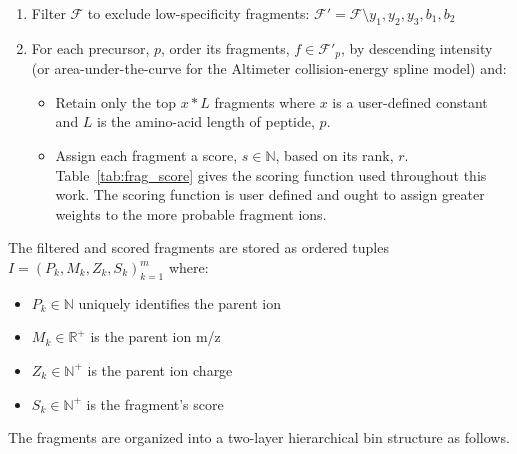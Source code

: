 \documentclass[pdflatex,sn-nature]{sn-jnl}
\begin{document}
\begin{enumerate}
\item Filter $\mathcal{F}$ to exclude low-specificity fragments: $\mathcal{F}' = \mathcal{F} \setminus {y_1, y_2, y_3, b_1, b_2}$
\item For each precursor, $p$, order its fragments, $f \in \mathcal{F}'_p$, by descending intensity (or area-under-the-curve for the Altimeter collision-energy spline model) and:
    \begin{itemize}
        \item Retain only the top $x*L$ fragments where $x$ is a user-defined constant and $L$ is the amino-acid length of peptide, $p$.
        \item Assign each fragment a score, $s \in \mathbb{N}$, based on its rank, $r$. Table~\ref{tab:frag_score} gives the scoring function used throughout this work. The scoring function is user defined and ought to assign greater weights to the more probable fragment ions. 
    \end{itemize}
\end{enumerate}

The filtered and scored fragments are stored as ordered tuples $I = {(P_k, M_k, Z_k, S_k)}_{k=1}^m$ where:

\begin{itemize}
\item $P_k \in \mathbb{N}$ uniquely identifies the parent ion
\item $M_k \in \mathbb{R}^+$ is the parent ion m/z
\item $Z_k \in  \mathbb{N}^+$ is the parent ion charge
\item $S_k \in \mathbb{N}^+$ is the fragment's score
\end{itemize}

The fragments are organized into a two-layer hierarchical bin structure as follows.
\end{document}
